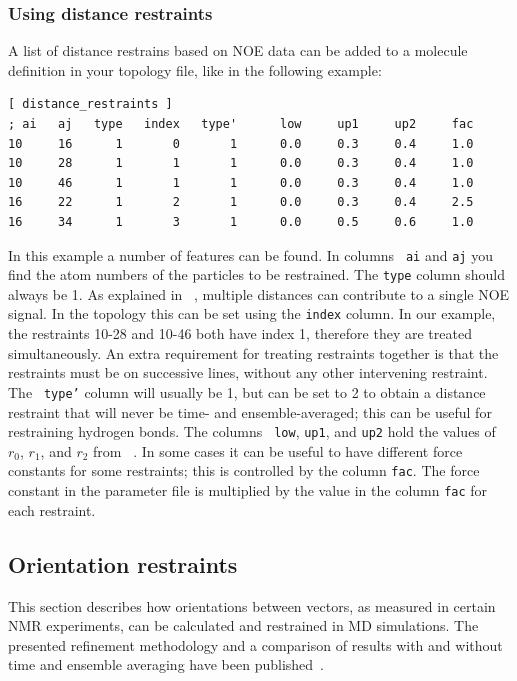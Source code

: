 \subsubsection{Using distance restraints}

A list of distance restrains based on NOE data can be added to a molecule
definition in your topology file, like in the following example:

\begin{verbatim}
[ distance_restraints ]
; ai   aj   type   index   type'      low     up1     up2     fac
10     16      1       0       1      0.0     0.3     0.4     1.0
10     28      1       1       1      0.0     0.3     0.4     1.0
10     46      1       1       1      0.0     0.3     0.4     1.0
16     22      1       2       1      0.0     0.3     0.4     2.5
16     34      1       3       1      0.0     0.5     0.6     1.0
\end{verbatim}

In this example a number of features can be found.  In columns {\tt
ai} and {\tt aj} you find the atom numbers of the particles to be
restrained. The {\tt type} column should always be 1.  As explained in
~, multiple distances can contribute to a single NOE
signal. In the topology this can be set using the {\tt index}
column. In our example, the restraints 10-28 and 10-46 both have index
1, therefore they are treated simultaneously.  An extra requirement
for treating restraints together is that the restraints must be on
successive lines, without any other intervening restraint.  The {\tt
type'} column will usually be 1, but can be set to 2 to obtain a
distance restraint that will never be time- and ensemble-averaged;
this can be useful for restraining hydrogen bonds.  The columns {\tt
low}, {\tt up1}, and {\tt up2} hold the values of $r_0$, $r_1$, and
$r_2$ from ~.  In some cases it can be useful to have
different force constants for some restraints; this is controlled by
the column {\tt fac}.  The force constant in the parameter file is
multiplied by the value in the column {\tt fac} for each restraint.

\newcommand{\SSS}{{\mathbf S}}
\newcommand{\DD}{{\mathbf D}}
\newcommand{\RR}{{\mathbf R}}

\subsection{Orientation restraints}
\label{subsec:orientationrestraint}
This section describes how orientations between vectors,
as measured in certain NMR experiments, can be calculated
and restrained in MD simulations.
The presented refinement methodology and a comparison of results
with and without time and ensemble averaging have been
published~\cite{Hess2003}.
